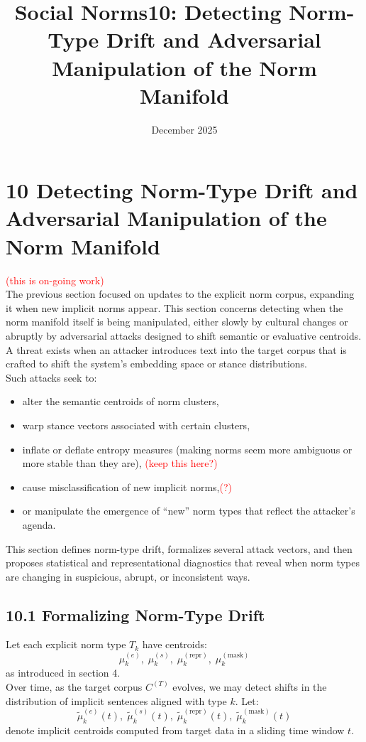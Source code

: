 \documentclass{article}
\title{Social Norms}
\date{December 2025}
\title{10: Detecting Norm-Type Drift and Adversarial Manipulation of the Norm Manifold}
\date{}
\begin{document}
\section*{10  Detecting Norm-Type Drift and Adversarial Manipulation of the Norm Manifold }
\textcolor{red}{(this is on-going work)} \\

The previous section focused on updates to the explicit norm corpus, expanding it when new implicit norms appear. This section concerns detecting when the norm manifold itself is being manipulated, either slowly by cultural changes or abruptly by adversarial attacks designed to shift semantic or evaluative centroids. \\

A threat exists when an attacker introduces text into the target corpus that is crafted to shift the system’s embedding space or stance distributions. \\

Such attacks seek to:
\begin{itemize}
    \item alter the semantic centroids of norm clusters,
    \item warp stance vectors associated with certain clusters,
    \item inflate or deflate entropy measures (making norms seem more ambiguous or more stable than they are), \textcolor{red}{(keep this here?)} 
    \item cause misclassification of new implicit norms,\textcolor{red}{(?)} 
    \item or manipulate the emergence of ``new'' norm types that reflect the attacker’s agenda.
\end{itemize}

This section defines norm-type drift, formalizes several attack vectors, and then proposes statistical and representational diagnostics that reveal when norm types are changing in suspicious, abrupt, or inconsistent ways.

\subsection*{10.1  Formalizing Norm-Type Drift}

Let each explicit norm type \( T_k \) have centroids:
\[
\mu_k^{(e)},\; \mu_k^{(s)},\; \mu_k^{(\text{repr})},\; \mu_k^{(\text{mask})}
\]
as introduced in section 4. \\

Over time, as the target corpus \( C^{(T)} \) evolves, we may detect shifts in the distribution of implicit sentences aligned with type \(k\). Let:
\[
\tilde{\mu}_k^{(e)}(t),\; \tilde{\mu}_k^{(s)}(t),\; \tilde{\mu}_k^{(\text{repr})}(t),\; \tilde{\mu}_k^{(\text{mask})}(t)
\]
denote implicit centroids computed from target data in a sliding time window \( t \). \\
\end{document}
